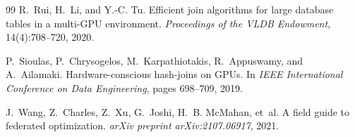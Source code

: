 \documentclass{article}
\begin{document}
\begin{thebibliography}{99}
R.~Rui, H.~Li, and Y.-C. Tu.
\newblock Efficient join algorithms for large database tables in a multi-{GPU}
environment.
\newblock \emph{Proceedings of the VLDB Endowment}, 14(4):708--720, 2020.

P.~Sioulas, P.~Chrysogelos, M.~Karpathiotakis, R.~Appuswamy, and A.~Ailamaki.
\newblock Hardware-conscious hash-joins on {GPU}s.
\newblock In \emph{IEEE International Conference on Data Engineering}, pages
698--709, 2019.

J.~Wang, Z.~Charles, Z.~Xu, G.~Joshi, H.~B. McMahan, et~al.
\newblock A field guide to federated optimization.
\newblock \emph{arXiv preprint arXiv:2107.06917}, 2021.

\end{thebibliography}
\end{document}
